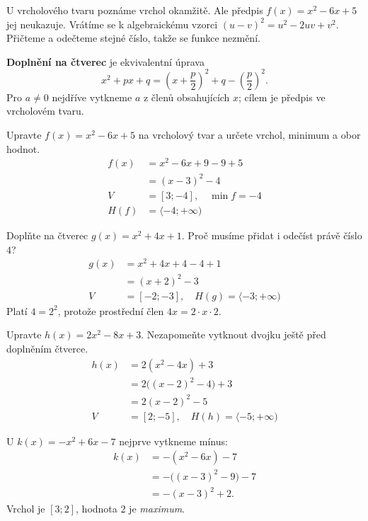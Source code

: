 \documentclass[11pt,a4paper]{article}
\begin{document}
U vrcholového tvaru poznáme vrchol okamžitě. Ale předpis $f(x)=x^2-6x+5$ jej neukazuje. Vrátíme se k algebraickému vzorci $(u-v)^2=u^2-2uv+v^2$. Přičteme a odečteme stejné číslo, takže se funkce nezmění.
\begin{definiceBox}[title={Definice - Doplnění na čtverec}]
\textbf{Doplnění na čtverec} je ekvivalentní úprava
\[ x^2+px+q=\left(x+\frac p2\right)^2+q-\left(\frac p2\right)^2. \]
Pro $a\ne0$ nejdříve vytkneme $a$ z členů obsahujících $x$; cílem je předpis ve vrcholovém tvaru.
\end{definiceBox}

\begin{prikladReseniBox}[title={Příklad 1}]
Upravte $f(x)=x^2-6x+5$ na vrcholový tvar a určete vrchol, minimum a obor hodnot.
\tcblower
\[
\begin{aligned}
f(x)&=x^2-6x+9-9+5 \\
&=(x-3)^2-4 \\
V&=[3;-4],\quad \min f=-4 \\
H(f)&=\langle-4;+\infty)
\end{aligned}
\]

\end{prikladReseniBox}
\begin{prikladReseniBox}[title={Příklad 2}]
Doplňte na čtverec $g(x)=x^2+4x+1$. Proč musíme přidat i odečíst právě číslo $4$?
\tcblower
\[
\begin{aligned}
g(x)&=x^2+4x+4-4+1 \\
&=(x+2)^2-3 \\
V&=[-2;-3],\quad H(g)=\langle-3;+\infty)
\end{aligned}
\]
Platí $4=2^2$, protože prostřední člen $4x=2\cdot x\cdot2$.
\end{prikladReseniBox}
\begin{prikladReseniBox}[title={Příklad 3}]
Upravte $h(x)=2x^2-8x+3$. Nezapomeňte vytknout dvojku ještě před doplněním čtverce.
\tcblower
\[
\begin{aligned}
h(x)&=2(x^2-4x)+3 \\
&=2\bigl((x-2)^2-4\bigr)+3 \\
&=2(x-2)^2-5 \\
V&=[2;-5],\quad H(h)=\langle-5;+\infty)
\end{aligned}
\]

\end{prikladReseniBox}
U $k(x)=-x^2+6x-7$ nejprve vytkneme mínus:
\[\begin{aligned}k(x)&=-(x^2-6x)-7\\&=-\bigl((x-3)^2-9\bigr)-7\\&=-(x-3)^2+2.\end{aligned}\]
Vrchol je $[3;2]$, hodnota $2$ je \emph{maximum}.
\end{document}
